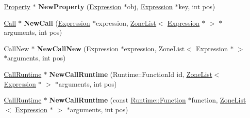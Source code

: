 \begin{DoxyCompactItemize}
\item 
\hyperlink{classv8_1_1internal_1_1_property}{Property} $\ast$ {\bfseries New\+Property} (\hyperlink{classv8_1_1internal_1_1_expression}{Expression} $\ast$obj, \hyperlink{classv8_1_1internal_1_1_expression}{Expression} $\ast$key, int pos)\hypertarget{classv8_1_1internal_1_1_b_a_s_e___e_m_b_e_d_d_e_d_a3b2729f897fc933cb411892661cb7378}{}\label{classv8_1_1internal_1_1_b_a_s_e___e_m_b_e_d_d_e_d_a3b2729f897fc933cb411892661cb7378}

\item 
\hyperlink{classv8_1_1internal_1_1_call}{Call} $\ast$ {\bfseries New\+Call} (\hyperlink{classv8_1_1internal_1_1_expression}{Expression} $\ast$expression, \hyperlink{classv8_1_1internal_1_1_zone_list}{Zone\+List}$<$ \hyperlink{classv8_1_1internal_1_1_expression}{Expression} $\ast$ $>$ $\ast$arguments, int pos)\hypertarget{classv8_1_1internal_1_1_b_a_s_e___e_m_b_e_d_d_e_d_ac182f0c434ebe561b69307dbeb9e4398}{}\label{classv8_1_1internal_1_1_b_a_s_e___e_m_b_e_d_d_e_d_ac182f0c434ebe561b69307dbeb9e4398}

\item 
\hyperlink{classv8_1_1internal_1_1_call_new}{Call\+New} $\ast$ {\bfseries New\+Call\+New} (\hyperlink{classv8_1_1internal_1_1_expression}{Expression} $\ast$expression, \hyperlink{classv8_1_1internal_1_1_zone_list}{Zone\+List}$<$ \hyperlink{classv8_1_1internal_1_1_expression}{Expression} $\ast$ $>$ $\ast$arguments, int pos)\hypertarget{classv8_1_1internal_1_1_b_a_s_e___e_m_b_e_d_d_e_d_abce7dc6a3659d40639591415c941a5a0}{}\label{classv8_1_1internal_1_1_b_a_s_e___e_m_b_e_d_d_e_d_abce7dc6a3659d40639591415c941a5a0}

\item 
\hyperlink{classv8_1_1internal_1_1_call_runtime}{Call\+Runtime} $\ast$ {\bfseries New\+Call\+Runtime} (Runtime\+::\+Function\+Id id, \hyperlink{classv8_1_1internal_1_1_zone_list}{Zone\+List}$<$ \hyperlink{classv8_1_1internal_1_1_expression}{Expression} $\ast$ $>$ $\ast$arguments, int pos)\hypertarget{classv8_1_1internal_1_1_b_a_s_e___e_m_b_e_d_d_e_d_ae0805e9e176e88bfec2938facd1f79d2}{}\label{classv8_1_1internal_1_1_b_a_s_e___e_m_b_e_d_d_e_d_ae0805e9e176e88bfec2938facd1f79d2}

\item 
\hyperlink{classv8_1_1internal_1_1_call_runtime}{Call\+Runtime} $\ast$ {\bfseries New\+Call\+Runtime} (const \hyperlink{structv8_1_1internal_1_1_runtime_1_1_function}{Runtime\+::\+Function} $\ast$function, \hyperlink{classv8_1_1internal_1_1_zone_list}{Zone\+List}$<$ \hyperlink{classv8_1_1internal_1_1_expression}{Expression} $\ast$ $>$ $\ast$arguments, int pos)\hypertarget{classv8_1_1internal_1_1_b_a_s_e___e_m_b_e_d_d_e_d_a66fb74a2686840af3287964cdc7eb527}{}\label{classv8_1_1internal_1_1_b_a_s_e___e_m_b_e_d_d_e_d_a66fb74a2686840af3287964cdc7eb527}


\end{DoxyCompactItemize}
